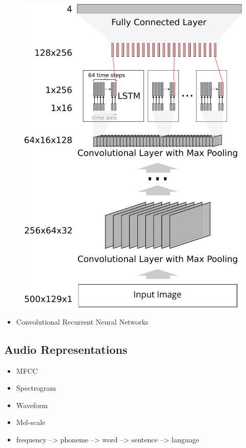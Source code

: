 	\begin{figure}[]
  		\centering
    	\includegraphics[width=\textwidth, keepaspectratio]{img/crnn2.pdf}
    	\caption{}
    	\label{fig:crnn}
	\end{figure}

    \begin{itemize}
        \item Convolutional Recurrent Neural Networks
    \end{itemize}

\subsection{Audio Representations}
\label{sec:audio_representations}
    \begin{itemize}
        \item MFCC
        \item Spectrogram
        \item Waveform
        \item Mel-scale
        \item frequency --> phoneme --> word --> sentence --> language
    \end{itemize}